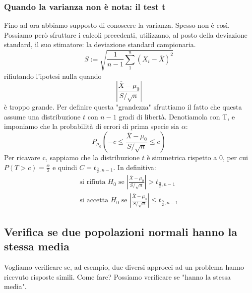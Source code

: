 \documentclass[11pt]{article}
\begin{document}
\subsubsection{Quando la varianza non è nota: il test t}
Fino ad ora abbiamo supposto di conoscere la varianza. Spesso non è così. Possiamo però sfruttare i calcoli precedenti, utilizzano, al posto della deviazione standard, il suo stimatore: la deviazione standard campionaria.
\begin{displaymath}
    S := \sqrt{\frac{1}{n-1}\sum_1^n(X_i-\overline{X})^2}
\end{displaymath}
rifiutando l'ipotesi nulla quando
\begin{displaymath}
    \left| \frac{\overline{X}- \mu_0}{S/\sqrt{n}}    \right|
\end{displaymath}
è troppo grande. Per definire questa "grandezza" sfruttiamo il fatto che questa assume una distribuzione $t$ con $n-1$ gradi di libertà. Denotiamola con T, e imponiamo che la probabilità di errori di prima specie sia $\alpha$:
\begin{displaymath}
    P_{\mu_0}\left(-c \le \frac{\overline{X}- \mu_0}{S/\sqrt{n}} \le c\right)
\end{displaymath}
Per ricavare c, sappiamo che la distribuzione $t$ è simmetrica rispetto a 0, per cui $P(T > c) = \frac{\alpha}{2}$ e quindi $C=t_{\frac{\alpha}{2},n-1}$.
In definitiva:
\begin{gather*}
    \mbox{si rifiuta } H_0\mbox{ se }\left|\frac{\overline{X}-\mu_0}{S/\sqrt{n}}     \right| > t_{\frac{\alpha}{2},n-1} \\ 
    \mbox{si accetta } H_0\mbox{ se }\left|\frac{\overline{X}-\mu_0}{S/\sqrt{n}}     \right| \le t_{\frac{\alpha}{2},n-1}
\end{gather*}
\subsection{Verifica se due popolazioni normali hanno la stessa media}
Vogliamo verificare se, ad esempio, due diversi approcci ad un problema hanno ricevuto risposte simili. Come fare? Possiamo verificare se "hanno la stessa media".
\end{document}
